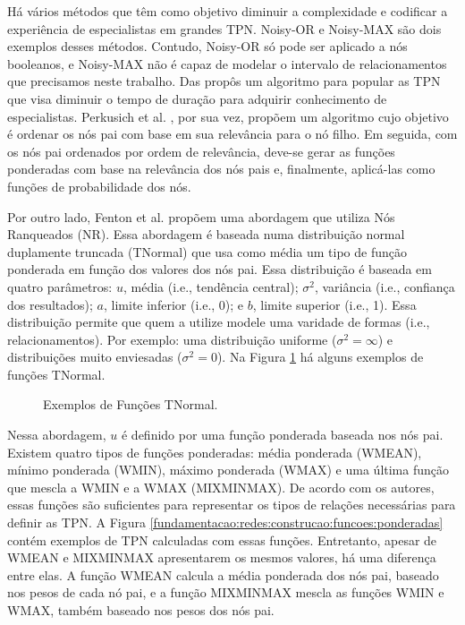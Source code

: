 Há vários métodos que têm como objetivo diminuir a complexidade e codificar a experiência de especialistas em grandes TPN. Noisy-OR \cite{huang} e Noisy-MAX \cite{diez} são dois exemplos desses métodos. Contudo, Noisy-OR só pode ser aplicado a nós booleanos, e Noisy-MAX não é capaz de modelar o intervalo de relacionamentos que precisamos neste trabalho. Das \cite{das} propôs um algoritmo para popular as TPN que visa diminuir o tempo de duração para adquirir conhecimento de especialistas. Perkusich et al. \cite{perkusichNPT}, por sua vez, propõem um algoritmo cujo objetivo é ordenar os nós pai com base em sua relevância para o nó filho. Em seguida, com os nós pai ordenados por ordem de relevância, deve-se gerar as funções ponderadas com base na relevância dos nós pais e, finalmente, aplicá-las como funções de probabilidade dos nós.

Por outro lado, Fenton et al. \cite{fenton} propõem uma abordagem que utiliza Nós Ranqueados (NR). Essa abordagem é baseada numa distribuição normal duplamente truncada (TNormal) que usa como média um tipo de função ponderada em função dos valores dos nós pai. Essa distribuição é baseada em quatro parâmetros: $u$, média (i.e., tendência central); $\sigma^{2}$, variância (i.e., confiança dos resultados); $a$, limite inferior (i.e., 0); e $b$, limite superior (i.e., 1). Essa distribuição permite que quem a utilize modele uma varidade de formas (i.e., relacionamentos). Por exemplo: uma distribuição uniforme ($\sigma^{2} = \infty$) e distribuições muito enviesadas ($\sigma^{2} = 0$). Na Figura \ref{fundamentacao:redes:construcao:funcoes:tnormal} há alguns exemplos de funções TNormal.

\begin{figure}[ht!]
\begin{center}
	\end{center}
	\caption{Exemplos de Funções TNormal.}
	\label{fundamentacao:redes:construcao:funcoes:tnormal}
\end{figure}

Nessa abordagem, $u$ é definido por uma função ponderada baseada nos nós pai. Existem quatro tipos de funções ponderadas: média ponderada (WMEAN), mínimo ponderada (WMIN), máximo ponderada (WMAX) e uma última função que mescla a WMIN e a WMAX (MIXMINMAX). De acordo com os autores, essas funções são suficientes para representar os tipos de relações necessárias para definir as TPN. A Figura \ref{fundamentacao:redes:construcao:funcoes:ponderadas} contém exemplos de TPN calculadas com essas funções. Entretanto, apesar de WMEAN e MIXMINMAX apresentarem os mesmos valores, há uma diferença entre elas. A função WMEAN calcula a média ponderada dos nós pai, baseado nos pesos de cada nó pai, e a função MIXMINMAX mescla as funções WMIN e WMAX, também baseado nos pesos dos nós pai.

